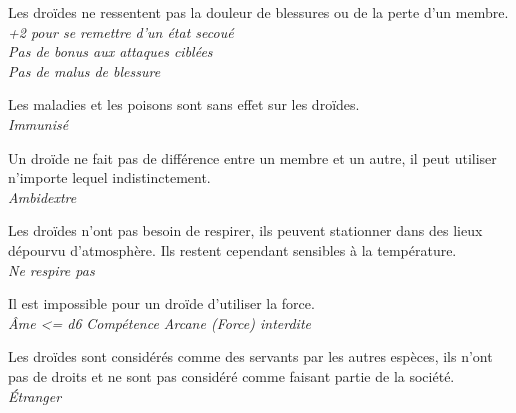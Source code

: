\begin{description}[align=left]
\item [Créature artificielle] 	%
		Les droïdes ne ressentent pas la douleur de blessures ou de la perte d’un membre.\\
		\textit{+2 pour se remettre d’un état secoué}\\
		\textit{Pas de bonus aux attaques ciblées}\\
		\textit{Pas de malus de blessure}

\item [Immunisé] 				%
		Les maladies et les poisons sont sans effet sur les droïdes.\\
		\textit{Immunisé}

\item [Ambidextre] 				%
		Un droïde ne fait pas de différence entre un membre et un autre, il peut utiliser n’importe lequel indistinctement.\\
		\textit{Ambidextre}

\item [Manque pas d’air] 		%
		Les droïdes n’ont pas besoin de respirer, ils peuvent stationner dans des lieux dépourvu d’atmosphère. Ils restent cependant sensibles à la température.\\
		\textit{Ne respire pas}

\item [Pas d’\^Ame] 			%
		Il est impossible pour un droïde d’utiliser la force.\\
		\textit{\^Ame <= d6}
		\textit{Compétence Arcane (Force) interdite}

\item [Outsider] 				%
		Les droïdes sont considérés comme des servants par les autres espèces, ils n’ont pas de droits et ne sont pas considéré comme faisant partie de la société.\\
		\textit{\'Etranger}
\end{description}